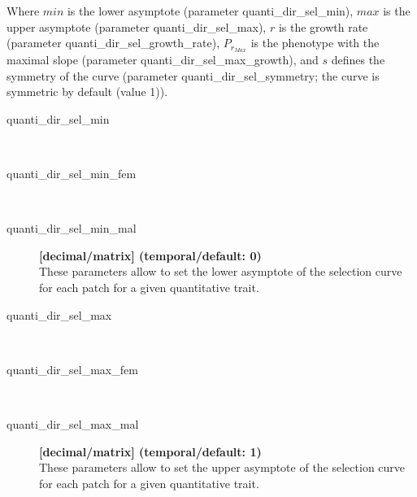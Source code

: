 \documentclass[letterpaper,12pt,oneside]{book}
\begin{document}
Where $min$ is the lower asymptote (parameter \textsf{quanti\_dir\_sel\_min}), $max$ is the upper asymptote (parameter \textsf{quanti\_dir\_sel\_max}), $r$ is the growth rate (parameter \textsf{quanti\_dir\_sel\_growth\_rate}), $P_{r_{Max}}$ is the phenotype with the maximal slope (parameter \textsf{quanti\_dir\_sel\_max\_growth}), and $s$ defines the symmetry of the curve (parameter \textsf{quanti\_dir\_sel\_symmetry}; the curve is symmetric by default (value 1)).


\begin{description}

\item[quanti\_dir\_sel\_min]\hspace*{\fill}\\
\vspace{-9mm}
\item[quanti\_dir\_sel\_min\_fem]\hspace*{\fill}\\
\vspace{-9mm}
\item[quanti\_dir\_sel\_min\_mal]\textbf{[decimal/matrix] (temporal/default: 0)}\\
These parameters allow to set the lower asymptote of the selection curve for each patch for a given quantitative trait.

\item[quanti\_dir\_sel\_max]\hspace*{\fill}\\
\vspace{-9mm}
\item[quanti\_dir\_sel\_max\_fem]\hspace*{\fill}\\
\vspace{-9mm}
\item[quanti\_dir\_sel\_max\_mal]\textbf{[decimal/matrix] (temporal/default: 1)}\\
These parameters allow to set the upper asymptote of the selection curve for each patch for a given quantitative trait.


\end{description}
\end{document}
